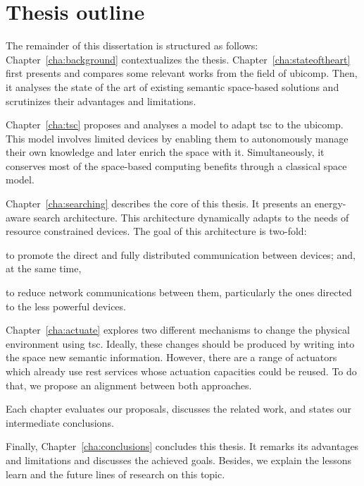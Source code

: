 \section{Thesis outline}
\label{sec:Outline}


The remainder of this dissertation is structured as follows:
Chapter~\ref{cha:background} contextualizes the thesis.
Chapter~\ref{cha:stateoftheart} first presents and compares some relevant works from the field of \acl{ubicomp}. %
Then, it analyses the state of the art of existing semantic space-based solutions and scrutinizes their advantages and limitations.

Chapter~\ref{cha:tsc} proposes and analyses a model to adapt \ac{tsc} to the \ac{ubicomp}.
This model involves limited devices by enabling them to autonomously manage their own knowledge and later enrich the space with it.
Simultaneously, it conserves most of the space-based computing benefits through a classical space model.

Chapter~\ref{cha:searching} describes the core of this thesis.
It presents an energy-aware search architecture.
This architecture dynamically adapts to the needs of resource constrained devices.
The goal of this architecture is two-fold:
\begin{enumerate*}[label=\itshape\alph*\upshape)]
  \item to promote the direct and fully distributed communication between devices;
and, at the same time,
  \item to reduce network communications between them, particularly the ones directed to the less powerful devices.
\end{enumerate*}

Chapter~\ref{cha:actuate} explores two different mechanisms to change the physical environment using \ac{tsc}.
Ideally, these changes should be produced by writing into the space new semantic information. %
However, there are a range of actuators which already use \ac{rest} services whose actuation capacities could be reused.
To do that, we propose an alignment between both approaches. %


Each chapter evaluates our proposals, discusses the related work, and states our intermediate conclusions. %

Finally, Chapter~\ref{cha:conclusions} concludes this thesis.
It remarks its advantages and limitations and discusses the achieved goals.
Besides, we explain the lessons learn and the future lines of research on this topic. %